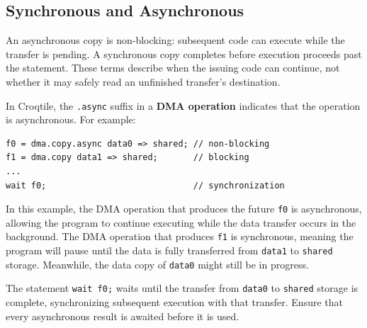 \subsection*{Synchronous and Asynchronous}

An asynchronous copy is non-blocking: subsequent code can execute while the transfer is pending. A synchronous copy completes before execution proceeds past the statement. These terms describe when the issuing code can continue, not whether it may safely read an unfinished transfer's destination.

In Croqtile, the \texttt{.async} suffix in a \textbf{DMA operation} indicates that the operation is asynchronous. For example:

\begin{lstlisting}[language=croqtile,caption={Synchronous and Asynchronous}]
f0 = dma.copy.async data0 => shared; // non-blocking
f1 = dma.copy data1 => shared;       // blocking
...
wait f0;                             // synchronization
\end{lstlisting}

In this example, the DMA operation that produces the future \texttt{f0} is asynchronous, allowing the program to continue executing while the data transfer occurs in the background. The DMA operation that produces \texttt{f1} is synchronous, meaning the program will pause until the data is fully transferred from \texttt{data1} to \texttt{shared} storage. Meanwhile, the data copy of \texttt{data0} might still be in progress.

The statement \texttt{wait f0;} waits until the transfer from \texttt{data0} to \texttt{shared} storage is complete, synchronizing subsequent execution with that transfer. Ensure that every asynchronous result is awaited before it is used.
